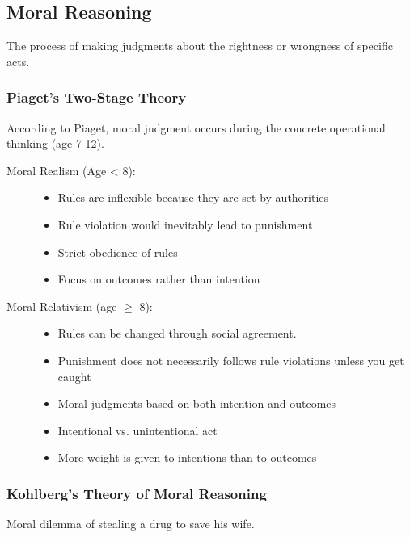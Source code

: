 \documentclass[../main/main.tex]{subfiles}
\begin{document}
\subsection{Moral Reasoning}
\begin{definition}
The process of making judgments about the rightness or wrongness of specific acts.
\end{definition}

\subsubsection{Piaget’s Two-Stage Theory}
According to Piaget, moral judgment occurs during the concrete operational thinking (age 7-12).
\begin{description}
	\item[Moral Realism (Age < 8):]
        \begin{itemize}
          \item Rules are inflexible because they are set by authorities
          \item Rule violation would inevitably lead to punishment
          \item Strict obedience of rules
                \item Focus on outcomes rather than intention
        \end{itemize}
        \item[Moral Relativism (age $\geq$ 8):]
        \begin{itemize}
          \item Rules can be changed through social agreement.
          \item Punishment does not necessarily follows rule violations unless you get caught
            \item Moral judgments based on both intention and outcomes
          \item Intentional vs. unintentional act
                \item More weight is given to intentions than to outcomes
        \end{itemize}
\end{description}
\subsubsection{Kohlberg's Theory of Moral Reasoning}
Moral dilemma of stealing a drug to save his wife.\\
\end{document}
